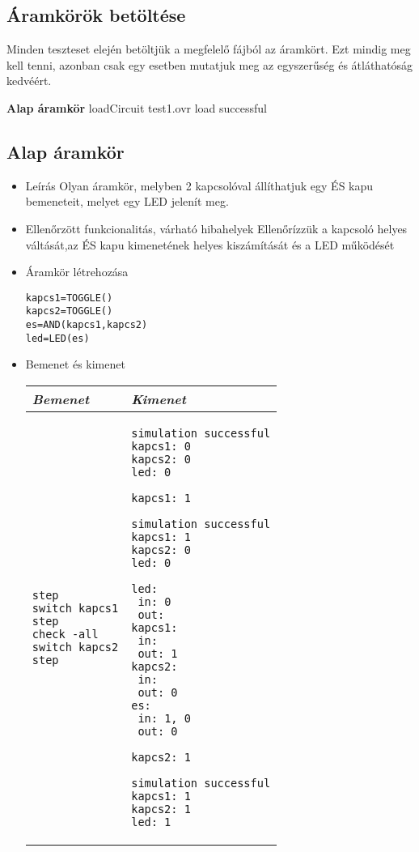 \subsection{Áramkörök betöltése}
Minden teszteset elején betöltjük a megfelelő fájból az áramkört. Ezt mindig meg kell tenni, azonban csak egy esetben mutatjuk meg az egyszerűség és átláthatóság kedvéért.

\textbf{Alap áramkör}\newline
loadCircuit test1.ovr\newline
\newline
load successful


\subsection{Alap áramkör}
\begin{itemize}
\item Leírás\newline
Olyan áramkör, melyben 2 kapcsolóval állíthatjuk egy ÉS kapu bemeneteit, melyet egy LED jelenít meg.
\item Ellenőrzött funkcionalitás, várható hibahelyek\newline
Ellenőrízzük a kapcsoló helyes váltását,az ÉS kapu kimenetének helyes kiszámítását és a LED működését
\item Áramkör létrehozása

\begin{verbatim}
kapcs1=TOGGLE()
kapcs2=TOGGLE()
es=AND(kapcs1,kapcs2)
led=LED(es)
\end{verbatim}

\item Bemenet és kimenet\newline

\begin{tabular}{|p{7cm}|p{7cm}|} 
\hline 
\textit{Bemenet} & \textit{Kimenet} \\ \hline
\begin{verbatim}
step
switch kapcs1
step
check -all
switch kapcs2
step
\end{verbatim}
& 
\begin{verbatim}
simulation successful
kapcs1: 0
kapcs2: 0
led: 0

kapcs1: 1

simulation successful
kapcs1: 1
kapcs2: 0
led: 0

led:
 in: 0
 out: 
kapcs1:
 in: 
 out: 1
kapcs2:
 in: 
 out: 0
es:
 in: 1, 0
 out: 0
 
kapcs2: 1

simulation successful
kapcs1: 1
kapcs2: 1
led: 1
\end{verbatim}
\\ \hline
\end{tabular}

\end{itemize}

